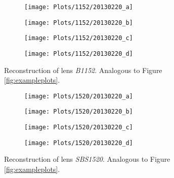\documentclass[10pt]{article}
\begin{document}
\begin{figure}[ht!]
 \centering
 \begin{subfigure}{.48\textwidth}
  \centering
  \texttt{[image: Plots/1152/20130220\_a]}
  \caption{}
 \end{subfigure}
 \begin{subfigure}{.48\textwidth}
  \centering
  \texttt{[image: Plots/1152/20130220\_b]}
  \caption{}
 \end{subfigure}
 
 \begin{subfigure}{.48\textwidth}
  \centering
  \texttt{[image: Plots/1152/20130220\_c]}
  \caption{}
 \end{subfigure}
 \begin{subfigure}{.48\textwidth}
  \centering
  \texttt{[image: Plots/1152/20130220\_d]}
  \caption{}
 \end{subfigure}
 \captionsetup{width=.93\textwidth}
 \caption{Reconstruction of lens \textit{B1152}. Analogous to Figure \ref{fig:exampleplots}.}
 \label{fig:1152}
\end{figure}

\begin{figure}[ht!]
 \centering
 \begin{subfigure}{.48\textwidth}
  \centering
  \texttt{[image: Plots/1520/20130220\_a]}
  \caption{}
 \end{subfigure}
 \begin{subfigure}{.48\textwidth}
  \centering
  \texttt{[image: Plots/1520/20130220\_b]}
  \caption{}
 \end{subfigure}
 
 \begin{subfigure}{.48\textwidth}
  \centering
  \texttt{[image: Plots/1520/20130220\_c]}
  \caption{}
 \end{subfigure}
 \begin{subfigure}{.48\textwidth}
  \centering
  \texttt{[image: Plots/1520/20130220\_d]}
  \caption{}
 \end{subfigure}
 \captionsetup{width=.93\textwidth}
 \caption{Reconstruction of lens \textit{SBS1520}. Analogous to Figure \ref{fig:exampleplots}.}
 \label{fig:1520}
\end{figure}
\end{document}
